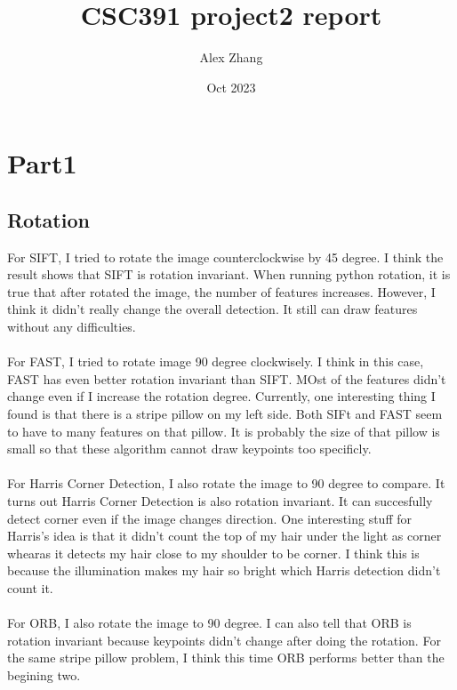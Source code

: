 \documentclass{article}
\title{CSC391 project2 report}
\author{Alex Zhang}
\date{Oct 2023}
\begin{document}
\maketitle
\section*{Part1}
\subsection*{Rotation}
For SIFT, I tried to rotate the image counterclockwise by 45 degree.
I think the result shows that SIFT is rotation invariant. 
When running python rotation, it is true that after rotated the image, the number of features increases.
However, I think it didn't really change the overall detection. 
It still can draw features without any difficulties.\\
\\
For FAST, I tried to rotate image 90 degree clockwisely.
I think in this case, FAST has even better rotation invariant than SIFT.
MOst of the features didn't change even if I increase the rotation degree.
Currently, one interesting thing I found is that there is a stripe pillow on my left side.
Both SIFt and FAST seem to have to many features on that pillow. 
It is probably the size of that pillow is small so that these algorithm cannot draw keypoints too specificly.\\
\\
For Harris Corner Detection, I also rotate the image to 90 degree to compare.
It turns out Harris Corner Detection is also rotation invariant.
It can succesfully detect corner even if the image changes direction.
One interesting stuff for Harris's idea is that it didn't count the top of my hair under the light as corner whearas it detects my hair close to my shoulder to be corner.
I think this is because the illumination makes my hair so bright which Harris detection didn't count it.\\
\\
For ORB, I also rotate the image to 90 degree.
I can also tell that ORB is rotation invariant because keypoints didn't change after doing the rotation.
For the same stripe pillow problem, I think this time ORB performs better than the begining two.
\end{document}
